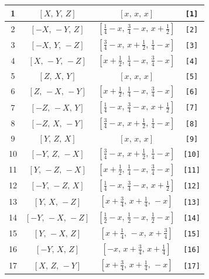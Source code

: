 \documentclass[fleqn,8pt]{jsarticle}
\begin{document}
\begin{longtable}{cccc}
1 & $\left[ X,\, Y,\, Z \right]$ & $\left[ x,\, x,\, x \right]$ & {\tt [1]} \\ \hline
2 & $\left[ - X,\, - Y,\, Z \right]$ & $\left[ \frac{1}{4} - x,\, \frac{3}{4} - x,\, x + \frac{1}{2} \right]$ & {\tt [2]} \\ \hline
3 & $\left[ - X,\, Y,\, - Z \right]$ & $\left[ \frac{3}{4} - x,\, x + \frac{1}{2},\, \frac{1}{4} - x \right]$ & {\tt [3]} \\ \hline
4 & $\left[ X,\, - Y,\, - Z \right]$ & $\left[ x + \frac{1}{2},\, \frac{1}{4} - x,\, \frac{3}{4} - x \right]$ & {\tt [4]} \\ \hline
5 & $\left[ Z,\, X,\, Y \right]$ & $\left[ x,\, x,\, x \right]$ & {\tt [5]} \\ \hline
6 & $\left[ Z,\, - X,\, - Y \right]$ & $\left[ x + \frac{1}{2},\, \frac{1}{4} - x,\, \frac{3}{4} - x \right]$ & {\tt [6]} \\ \hline
7 & $\left[ - Z,\, - X,\, Y \right]$ & $\left[ \frac{1}{4} - x,\, \frac{3}{4} - x,\, x + \frac{1}{2} \right]$ & {\tt [7]} \\ \hline
8 & $\left[ - Z,\, X,\, - Y \right]$ & $\left[ \frac{3}{4} - x,\, x + \frac{1}{2},\, \frac{1}{4} - x \right]$ & {\tt [8]} \\ \hline
9 & $\left[ Y,\, Z,\, X \right]$ & $\left[ x,\, x,\, x \right]$ & {\tt [9]} \\ \hline
10 & $\left[ - Y,\, Z,\, - X \right]$ & $\left[ \frac{3}{4} - x,\, x + \frac{1}{2},\, \frac{1}{4} - x \right]$ & {\tt [10]} \\ \hline
11 & $\left[ Y,\, - Z,\, - X \right]$ & $\left[ x + \frac{1}{2},\, \frac{1}{4} - x,\, \frac{3}{4} - x \right]$ & {\tt [11]} \\ \hline
12 & $\left[ - Y,\, - Z,\, X \right]$ & $\left[ \frac{1}{4} - x,\, \frac{3}{4} - x,\, x + \frac{1}{2} \right]$ & {\tt [12]} \\ \hline
13 & $\left[ Y,\, X,\, - Z \right]$ & $\left[ x + \frac{3}{4},\, x + \frac{1}{4},\, - x \right]$ & {\tt [13]} \\ \hline
14 & $\left[ - Y,\, - X,\, - Z \right]$ & $\left[ \frac{1}{2} - x,\, \frac{1}{2} - x,\, \frac{1}{2} - x \right]$ & {\tt [14]} \\ \hline
15 & $\left[ Y,\, - X,\, Z \right]$ & $\left[ x + \frac{1}{4},\, - x,\, x + \frac{3}{4} \right]$ & {\tt [15]} \\ \hline
16 & $\left[ - Y,\, X,\, Z \right]$ & $\left[ - x,\, x + \frac{3}{4},\, x + \frac{1}{4} \right]$ & {\tt [16]} \\ \hline
17 & $\left[ X,\, Z,\, - Y \right]$ & $\left[ x + \frac{3}{4},\, x + \frac{1}{4},\, - x \right]$ & {\tt [17]} \\ \hline

\end{longtable}
\end{document}
